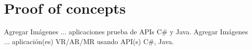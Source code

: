 \chapter{Proof of concepts}
\label{finales:anexo3}
Agregar Imágenes ... aplicaciones prueba de APIs C\# y Java. 
Agregar Imágenes ... aplicación(es) VR/AR/MR usando API(s) C\#, Java.
